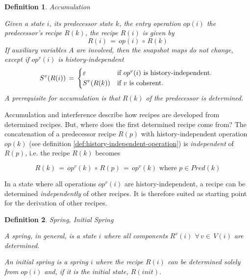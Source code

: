 \documentclass[12pt,a4paper]{scrartcl}
\newtheorem{definition}{Definition}
\begin{document}
\begin{definition} Accumulation

Given a state $i$, its predecessor state $k$, the entry operation $op(i)$
the predecessor's recipe $R(k)$, the recipe $R(i)$ is given by
\begin{equation}
       R(i)\,=\,op(i)\,\circ\,R(k)
\end{equation}
If auxiliary variables $A$ are involved, then the snapshot maps do not change,
except if $op^v(i)$ is history-independent
\begin{equation} \label{eq:accumulation-aux}
    S^v(R(i))\,=\,\begin{dcases*}
                  \varepsilon & if $op^v(i)$ is history-independent. \\
                  S^v(R(k))   & if $v$ is coherent.\\
                \end{dcases*}
\end{equation}
A prerequisite for accumulation is that $R(k)$ of the predecessor is 
determined.
\end{definition}

Accumulation and interference describe how recipes are developed from
determined recipes.  But, where does the first determined recipe come from?
The concatenation of a predecessor recipe $R(p)$ with history-independent
operation $op(k)$ (see definition \ref{def:history-independent-operation}) is
\textit{independent} of $R(p)$, i.e. the recipe $R(k)$ becomes

\begin{equation}
    R(k)\,=\,op^v(k)\,\circ\,R(p)\,=\,op^v(k)\,\,\mbox{where $p\in Pred(k)$}
\end{equation}

In a state where all operations $op^v(i)$ are history-independent, a recipe can
be determined \textit{independently} of other recipes. It is therefore suited
as starting point for the derivation of other recipes.

\begin{definition} Spring, Initial Spring \label{def:springs}

    A spring, in general, is a state $i$ where all components $R^v(i)$
    $\forall\,v\in\,V(i)$ are determined.
    
    An initial spring is a spring $i$ where the recipe $R(i)$ can be determined
    solely from $op(i)$ and, if it is the initial state, $R(init)$. 

\end{definition}
\end{document}
